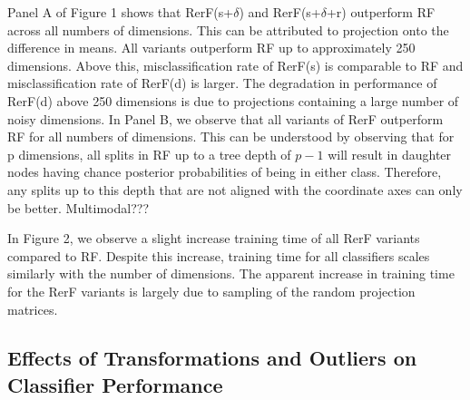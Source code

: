 \documentclass{article} %
\begin{document}
Panel A of Figure 1 shows that RerF(s+$\delta$) and RerF(s+$\delta$+r) outperform RF across all numbers of dimensions. This can be attributed to projection onto the difference in means. All variants outperform RF up to approximately 250 dimensions. Above this, misclassification rate of RerF(s) is comparable to RF and misclassification rate of RerF(d) is larger. The degradation in performance of RerF(d) above 250 dimensions is due to projections containing a large number of noisy dimensions. In Panel B, we observe that all variants of RerF outperform RF for all numbers of dimensions. This can be understood by observing that for p dimensions, all splits in RF up to a tree depth of $p - 1$ will result in daughter nodes having chance posterior probabilities of being in either class. Therefore, any splits up to this depth that are not aligned with the coordinate axes can only be better. Multimodal???

In Figure 2, we observe a slight increase training time of all RerF variants compared to RF. Despite this increase, training time for all classifiers scales similarly with the number of dimensions. The apparent increase in training time for the RerF variants is largely due to sampling of the random projection matrices. 


\subsection{Effects of Transformations and Outliers on Classifier Performance}
\end{document}
